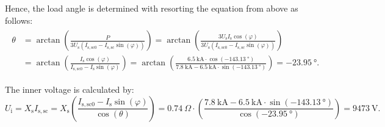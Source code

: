 \begin{solutionblock}
    Hence, the load angle is determined with resorting the equation from above as follows:
    \begin{align}
        \begin{split}
        \theta &= \arctan\left(\frac{P}{3 U_{\mathrm{s}}(I_{\mathrm{s,sc0}}-I_{\mathrm{s,sc}}\sin(\varphi))}\right)
        =\arctan\left(\frac{3 U_{\mathrm{s}} I_{\mathrm{s}} \cos(\varphi)}{3 U_{\mathrm{s}}(I_{\mathrm{s,sc0}}-I_{\mathrm{s,sc}}\sin(\varphi))}\right) \\
        &= \arctan\left(\frac{I_{\mathrm{s}}\cos(\varphi)}{I_{\mathrm{s,sc0}}-I_{\mathrm{s}}\sin(\varphi)} \right)
        = \arctan\left(\frac{\SI{6.5}{\kilo\ampere}\cdot \cos(\SI{-143.13}{\degree})}{\SI{7.8}{\kilo\ampere}-\SI{6.5}{\kilo\ampere}\cdot\sin(\SI{-143.13}{\degree})}\right)
        = \SI{-23.95}{\degree}.
        \end{split}
        \label{eq:load_angle}
    \end{align}

    The inner voltage is calculated by:
    \begin{equation}
        U_{\mathrm{i}} = X_{\mathrm{s}} I_{\mathrm{s,sc}}
        = X_{\mathrm{s}} \left(\frac{I_{\mathrm{s,sc0}}- I_{\mathrm{s}}\sin(\varphi)}{\cos(\theta)}\right)
        = \SI{0.74}{\Omega}\cdot\left(\frac{\SI{7.8}{\kilo\ampere}-\SI{6.5}{\kilo\ampere}\cdot\sin(\SI{-143.13}{\degree})}{\cos(\SI{-23.95}{\degree})}\right)
        = \SI{9473}{\volt}.
    \end{equation}
\end{solutionblock}



